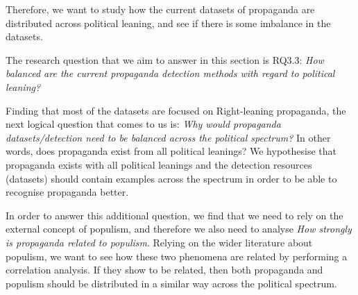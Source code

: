 
Therefore, we want to study how the current datasets of propaganda are distributed across political leaning, and see if there is some imbalance in the datasets. 





The research question that we aim to answer in this section is RQ3.3: \emph{How balanced are the current propaganda detection methods with regard to political leaning?}

Finding that most of the datasets are focused on Right-leaning propaganda, the next logical question that comes to us is: \emph{Why would propaganda datasets/detection need to be balanced across the political spectrum?} In other words, does propaganda exist from all political leanings?
We hypothesise that propaganda exists with all political leanings and the detection resources (datasets) should contain examples across the spectrum in order to be able to recognise propaganda better.

In order to answer this additional question, we find that we need to rely on the external concept of \gls{populism}, and therefore we also need to analyse \emph{How strongly is propaganda related to populism}.
Relying on the wider literature about populism, we want to see how these two phenomena are related by performing a correlation analysis.
If they show to be related, then both propaganda and populism should be distributed in a similar way across the political spectrum.



